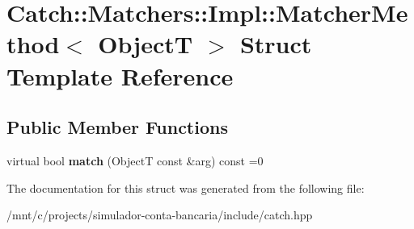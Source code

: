 \hypertarget{structCatch_1_1Matchers_1_1Impl_1_1MatcherMethod}{}\section{Catch\+:\+:Matchers\+:\+:Impl\+:\+:Matcher\+Method$<$ ObjectT $>$ Struct Template Reference}
\label{structCatch_1_1Matchers_1_1Impl_1_1MatcherMethod}
\subsection*{Public Member Functions}
\begin{DoxyCompactItemize}
\item 
\mbox{\label{structCatch_1_1Matchers_1_1Impl_1_1MatcherMethod_ae0920ff9e817acf08e1bb0cbcb044e30}} 
virtual bool {\bfseries match} (ObjectT const \&arg) const =0
\end{DoxyCompactItemize}


The documentation for this struct was generated from the following file\+:\begin{DoxyCompactItemize}
\item 
/mnt/c/projects/simulador-\/conta-\/bancaria/include/catch.\+hpp\end{DoxyCompactItemize}
